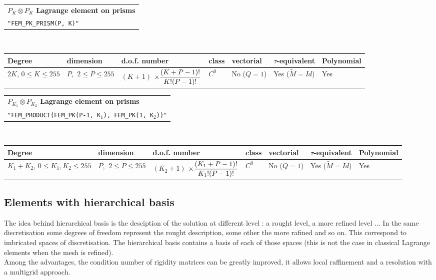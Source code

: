 \documentclass[11pt,a4paper]{article}
\begin{document}
\begin{center}
\begin{tabular}{|m{16.109cm}|} \hline 
{\bf $P_K \otimes P_K$ Lagrange element on prisms}\\
{\tt "FEM\_PK\_PRISM(P, K)"} 
\end{tabular} \\ \vspace{-1pt} 
\begin{tabular}{|m{2cm}|m{2cm}|m{2.5cm}|m{1.5cm}|m{1.5cm}|m{2cm}|m{2cm}|} \hline 
Degree & dimension & d.o.f. number & class & vectorial & \mbox{$\tau$-equivalent} & Polynomial\\ \hline
\small $2K$, \mbox{$0 \leq K \leq 255$} & \small $P$, \mbox{$\ 2 \leq P \leq 255$} & \mbox{$(K+1)$} \mbox{$\times {\displaystyle\frac{\displaystyle(K+P-1)!}{\displaystyle K! (P-1)!}}$} & $C^0$ & No \mbox{($Q = 1$)} & Yes \mbox{($\tilde{M} = Id$)}  & Yes\\ \hline
\end{tabular}
\end{center}

\begin{center}
\begin{tabular}{|m{16.109cm}|} \hline 
{\bf $P_{K_1} \otimes P_{K_2}$ Lagrange element on prisms}\\
{\tt "FEM\_PRODUCT(FEM\_PK(P-1, K$_1$), FEM\_PK(1, K$_2$))"} 
\end{tabular} \\ \vspace{-1pt} 
\begin{tabular}{|m{2cm}|m{2cm}|m{2.5cm}|m{1.5cm}|m{1.5cm}|m{2cm}|m{2cm}|} \hline 
Degree & dimension & d.o.f. number & class & vectorial & \mbox{$\tau$-equivalent} & Polynomial\\ \hline
\small \mbox{$K_1+K_2$}, \tiny \mbox{$0 \leq K_1,K_2 \leq 255$} & \small $P$, \mbox{$\ 2 \leq P \leq 255$} & \mbox{$(K_2+1)$} \mbox{$\times {\displaystyle\frac{\displaystyle(K_1+P-1)!}{\displaystyle K_1! (P-1)!}}$} & $C^0$ & No \mbox{($Q = 1$)} & Yes \mbox{($\tilde{M} = Id$)}  & Yes\\ \hline
\end{tabular}
\end{center}

\subsection{Elements with hierarchical basis}

The idea behind hierarchical basis is the desciption of the solution at different level : a rought level, a more refined level ... In the same discretisation some degrees of freedom represent the rought description, some other the more rafined and so on. This correspond to imbricated spaces of discretisation. The hierarchical basis contains a basis of each of those spaces (this is not the case in classical Lagrange elements when the mesh is refined).\\[0.5cm]
Among the advantages, the condition number of  rigidity matrices can be greatly improved, it allows local raffinement and a resolution with a multigrid approach.
\end{document}
